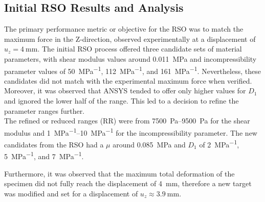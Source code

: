 \subsection*{Initial RSO Results and Analysis}
The primary performance metric or objective for the RSO was to match the maximum force in the Z-direction, 
observed experimentally at a displacement of $u_z=\SI{4}{\milli\meter}$.
The initial RSO process offered three candidate sets of material parameters, with shear modulus values 
around \SI{0.011}{\mega \pascal} and incompressibility parameter values of \SI{50}{\mega\pascal\tothe{-1}}, 
\SI{112}{\mega\pascal\tothe{-1}}, and \SI{161}{\mega\pascal\tothe{-1}}. Nevertheless, these candidates 
did not match with the experimental maximum force when verified. Moreover, it was observed that ANSYS 
tended to offer only higher values for $D_1$ and ignored the lower half of the range. This led to a decision to 
refine the parameter ranges further.\\

The refined or reduced ranges (RR) were from \SIrange{7500}{9500}{\pascal} for the shear modulus and 
\SIrange{1}{10}{\mega\pascal\tothe{-1}} for the incompressibility parameter. The new candidates from the RSO had a 
$\mu$ around \SI{0.085}{\mega \pascal} and $D_1$ of \SI{2}{\mega\pascal\tothe{-1}}, 
\SI{5}{\mega\pascal\tothe{-1}}, and \SI{7}{\mega\pascal\tothe{-1}}. 

Furthermore, it was observed that the maximum total deformation of the specimen did not fully reach the  
displacement of \SI{4}{\milli\meter}, therefore a new target was modified and set for a displacement 
of $u_z\approx\SI{3.9}{\milli\meter}$.

